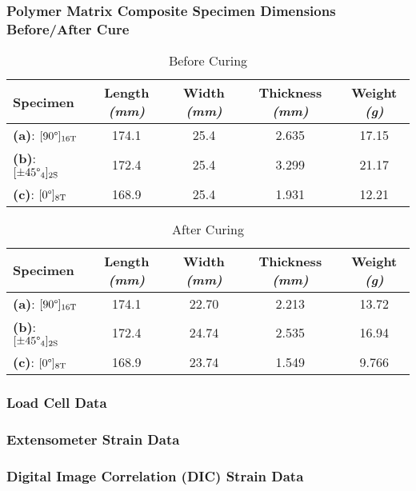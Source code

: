 \subsubsection{Polymer Matrix Composite Specimen Dimensions Before/After Cure}
\begin{table}[!h]
    \centering
    \caption{Before Curing}
    \begin{tabular}{|l||c|c|c|c|}\toprule
        Specimen & Length \textit{(mm)} & Width \textit{(mm)} & Thickness \textit{(mm)} & Weight \textit{(g)} \\ \midrule
        \textbf{(a)}: $[90\degree]_{16\text{T}}$ & 174.1 & 25.4 & 2.635 & 17.15 \\\hline
        \textbf{(b)}: $[\pm45\degree_4]_{2\text{S}}$ & 172.4 & 25.4 & 3.299 & 21.17 \\\hline
        \textbf{(c)}: $[0\degree]_{8\text{T}}$ & 168.9 & 25.4 & 1.931 & 12.21 \\\bottomrule
    \end{tabular}
    \label{tab:beforedimensions}
\end{table}
\begin{table}[!h]
    \centering
    \caption{After Curing}
    \begin{tabular}{|l||c|c|c|c|}\toprule
        Specimen & Length \textit{(mm)} & Width \textit{(mm)} & Thickness \textit{(mm)} & Weight \textit{(g)} \\ \midrule
        \textbf{(a)}: $[90\degree]_{16\text{T}}$ & 174.1 & 22.70 & 2.213 & 13.72 \\\hline
        \textbf{(b)}: $[\pm45\degree_4]_{2\text{S}}$ & 172.4 & 24.74 & 2.535 & 16.94 \\\hline
        \textbf{(c)}: $[0\degree]_{8\text{T}}$ & 168.9 & 23.74 & 1.549 & 9.766 \\\bottomrule
    \end{tabular}
    \label{tab:afterdimensions}
\end{table}

\subsubsection{Load Cell Data}

\subsubsection{Extensometer Strain Data}


\subsubsection{Digital Image Correlation (DIC) Strain Data}